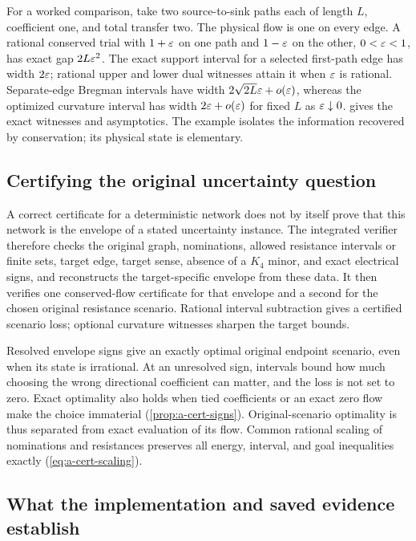 For a worked comparison, take two source-to-sink paths each of length
$L$, coefficient one, and total transfer two. The physical flow is one
on every edge. A rational conserved trial with $1+\varepsilon$ on one path
and $1-\varepsilon$ on the other, $0<\varepsilon<1$, has exact gap $2L\varepsilon^2$.
The exact support interval for a selected first-path edge has width
$2\varepsilon$; rational upper and lower dual witnesses attain it when
$\varepsilon$ is rational. Separate-edge Bregman intervals have width
$2\sqrt{2L}\varepsilon+o(\varepsilon)$, whereas the optimized curvature interval
has width $2\varepsilon+o(\varepsilon)$ for fixed $L$ as $\varepsilon\downarrow0$.
 gives the exact witnesses and asymptotics. The
example isolates the information recovered by conservation; its
physical state is elementary.

\subsection{Certifying the original uncertainty question}

A correct certificate for a deterministic network does not by itself
prove that this network is the envelope of a stated uncertainty
instance. The integrated verifier therefore checks the original graph,
nominations, allowed resistance intervals or finite sets, target edge,
target sense, absence of a $K_4$ minor, and exact electrical signs, and
reconstructs the target-specific envelope from these data. It then
verifies one conserved-flow certificate for that envelope and a second
for the chosen original resistance scenario. Rational interval
subtraction gives a certified scenario loss; optional curvature
witnesses sharpen the target bounds.

Resolved envelope signs give an exactly optimal original endpoint
scenario, even when its state is irrational. At an unresolved sign,
intervals bound how much choosing the wrong directional coefficient can
matter, and the loss is not set to zero. Exact optimality also holds
when tied coefficients or an exact zero flow make the choice immaterial
(\cref{prop:a-cert-signs}). Original-scenario optimality is thus
separated from exact evaluation of its flow. Common rational scaling of
nominations and resistances preserves all energy, interval, and goal
inequalities exactly (\cref{eq:a-cert-scaling}).

\subsection{What the implementation and saved evidence establish}

